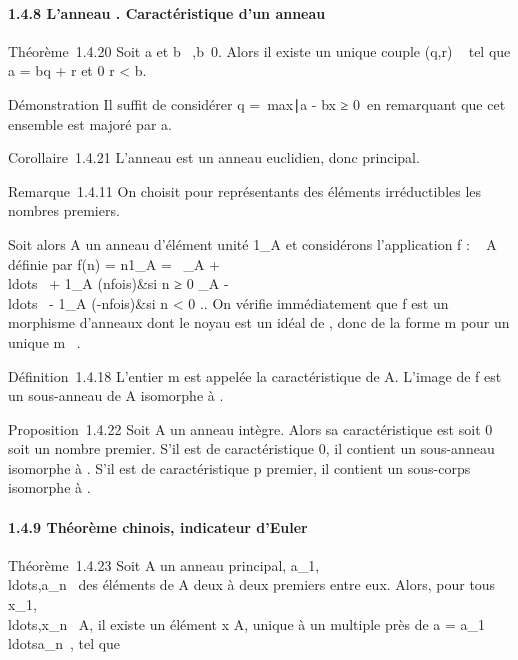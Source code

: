 \paragraph{1.4.8 L'anneau . Caractéristique d'un anneau}

Théorème~1.4.20 Soit a \in {} et b \in {}~,b\neq~0. Alors il existe un unique
couple (q,r) \in {} \times {}~ tel que a = bq + r et 0 \leq r < b.

Démonstration Il suffit de considérer q =\
max\x∣a - bx ≥
0\ en remarquant que cet ensemble est majoré par a.

Corollaire~1.4.21 L'anneau  est un anneau euclidien, donc principal.

Remarque~1.4.11 On choisit pour représentants des éléments irréductibles
les nombres premiers.

Soit alors A un anneau d'élément unité 1_A et considérons
l'application f :  \rightarrow~ A définie par f(n) = n1_A =
\left \ _A +
\\ldots~ +
1_A (n\text fois)&si n ≥ 0
_A
-\\ldots~ -
1_A (-n\text fois)&si n < 0 
\right .. On vérifie immédiatement que f est un morphisme
d'anneaux dont le noyau est un idéal de , donc de la forme m pour un
unique m \in \mathbb{N}~.

Définition~1.4.18 L'entier m est appelée la caractéristique de A.
L'image de f est un sous-anneau de A isomorphe à \mathbb{Z}\diagupm{}.

Proposition~1.4.22 Soit A un anneau intègre. Alors sa caractéristique
est soit 0 soit un nombre premier. S'il est de caractéristique 0, il
contient un sous-anneau isomorphe à . S'il est de caractéristique p
premier, il contient un sous-corps isomorphe à \mathbb{Z}\diagupp\mathbb{Z}.

\paragraph{1.4.9 Théorème chinois, indicateur d'Euler}

Théorème~1.4.23 Soit A un anneau principal,
a_1,\\ldots,a_n~
des éléments de A deux à deux premiers entre eux. Alors, pour tous
x_1,\\ldots,x_n~
\in A, il existe un élément x \in A, unique à un multiple près de a =
a_1\\ldotsa_n~,
tel que

